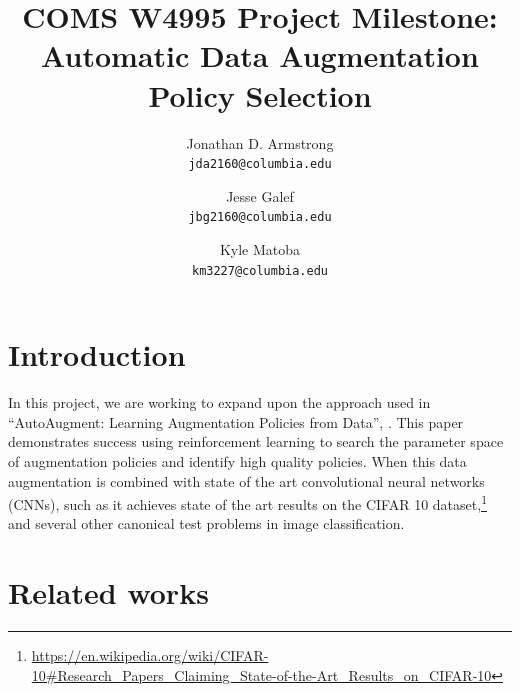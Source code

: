 \documentclass[10pt,twocolumn,letterpaper]{article}
\begin{document}
\title{COMS W4995 Project Milestone: Automatic Data Augmentation Policy Selection}

\author{Jonathan D. Armstrong\\
{\tt\small jda2160@columbia.edu}
\and
Jesse Galef\\
{\tt\small jbg2160@columbia.edu}
\and
Kyle Matoba\\
{\tt\small km3227@columbia.edu}
}

\maketitle


 
\section{Introduction}

	In this project, we are working to expand upon the approach used in ``AutoAugment: Learning Augmentation Policies from Data'', \cite{Cubuk2018}. This paper demonstrates success using reinforcement learning to search the parameter space of augmentation policies and identify high quality policies. When this data augmentation is combined with state of the art convolutional neural networks (CNNs), such as \cite{Yamada2018} it achieves state of the art results on the CIFAR 10 dataset,\footnote{\url{https://en.wikipedia.org/wiki/CIFAR-10\#Research\_Papers\_Claiming\_State-of-the-Art\_Results\_on\_CIFAR-10}} and several other canonical test problems in image classification. 
	

\section{Related works}
\end{document}
